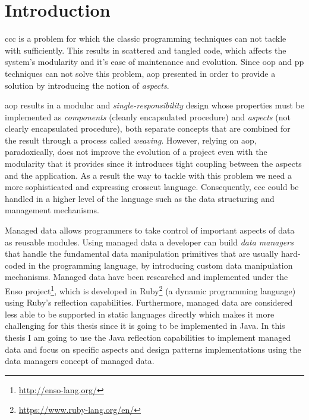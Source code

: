 \chapter{Introduction}\label{Introduction}
\ac{ccc} is a problem for which the classic programming techniques can not tackle with sufficiently. 
This results in scattered and tangled code, which affects the system's modularity and it's ease of maintenance and evolution. 
Since \ac{oop} and \ac{pp} techniques can not solve this problem, \ac{aop} presented \cite{kiczales1997aspect} in order to
provide a solution by introducing the notion of \textit{aspects}.

\ac{aop} results in a modular and \textit{single-responsibility} design whose properties must be implemented as \textit{components} (cleanly encapsulated procedure) and \textit{aspects} (not clearly encapsulated procedure), both separate concepts that are combined for the result through a process called \textit{weaving}. 
However, relying on \ac{aop}, paradoxically, does not improve the evolution of a project even with the modularity that it provides 
since it introduces tight coupling between the aspects and the application. 
As a result the way to tackle with this problem we need a more sophisticated and expressing crosscut language.
Consequently, \ac{ccc} could be handled in a higher level of the language such as the data structuring and management mechanisms.

Managed data \cite{loh2012managed} allows programmers to take control of important aspects of data as reusable modules. 
Using managed data a developer can build \textit{data managers} that handle the fundamental data manipulation primitives 
that are usually hard-coded in the programming language, by introducing custom data manipulation mechanisms. 
Managed data have been researched and implemented under the Enso project\footnote{\label{enso}\url{http://enso-lang.org/}}, which is developed in Ruby\footnote{\label{ruby}\url{https://www.ruby-lang.org/en/}} (a dynamic programming language) using Ruby’s reflection capabilities. 
Furthermore, managed data are considered less able to be supported in static languages directly which makes it more challenging for 
this thesis since it is going to be implemented in Java.
In this thesis I am going to use the Java reflection capabilities to implement managed data and focus on specific aspects and design patterns implementations using the data managers concept of managed data. 

